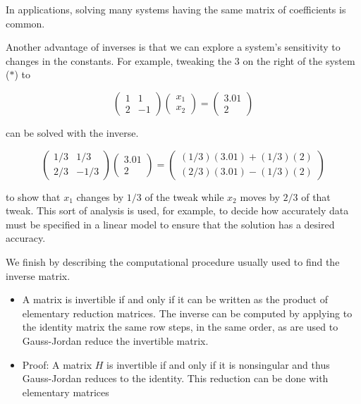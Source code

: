 In applications, solving many systems having the same matrix of coefficients is common.



Another advantage of inverses is that we can explore a system's sensitivity to changes in
the constants. For example, tweaking the $3$ on the right of the system ($*$) to



$$\begin{pmatrix} 1  & 1  \\ 2  & -1 \end{pmatrix} \begin{pmatrix} x _1 \\ x _2 \end{pmatrix} = \begin{pmatrix} 3.01 \\ 2 \end{pmatrix}$$



can be solved with the inverse.



$$\begin{pmatrix} 1/3  & 1/3  \\ 2/3  & -1/3 \end{pmatrix} \begin{pmatrix} 3.01 \\ 2 \end{pmatrix} = \begin{pmatrix} (1/3)(3.01)+(1/3)(2) \\ (2/3)(3.01)-(1/3)(2) \end{pmatrix}$$



to show that $x _1$ changes by $1/3$ of the tweak while $x _2$ moves by $2/3$ of that
tweak. This sort of analysis is used, for example, to decide how accurately data must be
specified in a linear model to ensure that the solution has a desired accuracy.



We finish by describing the computational procedure usually used to find the inverse matrix.



\begin{itemize}
    \item A matrix is invertible if and only if it can be written as the product of elementary reduction matrices. The inverse can be computed by applying to the identity matrix the same row steps, in the same order, as are used to Gauss-Jordan reduce the invertible matrix.
    \item Proof: A matrix $H$ is invertible if and only if it is nonsingular and thus Gauss-Jordan reduces to the identity. This reduction can be done with elementary matrices
\end{itemize}

